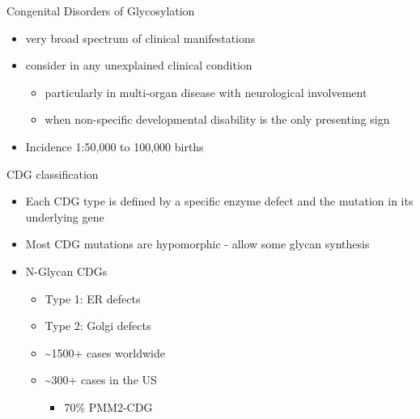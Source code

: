 \documentclass[presentation, smaller]{beamer}
\begin{document}
\begin{frame}[label={sec:org64a36b2}]{Congenital Disorders of Glycosylation}
\begin{itemize}
\item very broad spectrum of clinical manifestations
\item consider in any unexplained clinical condition
\begin{itemize}
\item particularly in multi-organ disease with neurological involvement
\item when non-specific developmental disability is the only presenting sign
\end{itemize}
\item Incidence 1:50,000 to 100,000 births
\end{itemize}
\end{frame}

\begin{frame}[label={sec:org9f18227}]{CDG classification}
\begin{itemize}
\item Each CDG type is defined by a specific enzyme defect and the mutation in its underlying gene
\item Most CDG mutations are hypomorphic - allow some glycan synthesis
\item N-Glycan CDGs
\begin{itemize}
\item Type 1: ER defects
\item Type 2: Golgi defects
\item \textasciitilde{}1500+ cases worldwide
\item \textasciitilde{}300+ cases in the US
\begin{itemize}
\item 70\% PMM2-CDG
\end{itemize}
\end{itemize}
\end{itemize}
\end{frame}
\end{document}
